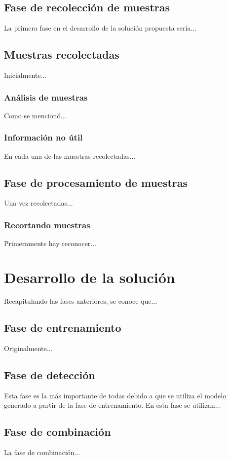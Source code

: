 \section{Fase de recolección de muestras}
La primera fase en el desarrollo de la solución propuesta sería...

\section{Muestras recolectadas}
Inicialmente...

\subsection{Análisis de muestras}
Como se mencionó...

\subsection{Información no útil}
En cada una de las muestras recolectadas...

\section{Fase de procesamiento de muestras}
Una vez recolectadas...

\subsection{Recortando muestras}
Primeramente hay reconocer...


\chapter{Desarrollo de la solución}
Recapitulando las fases anteriores, se conoce que...

\section{Fase de entrenamiento}
Originalmente...

\section{Fase de detección}
Esta fase es la más importante de todas debido a que se utiliza el modelo generado a partir de la fase de entrenamiento. En esta fase se utilizan... 

\section{Fase de combinación}
La fase de combinación...

